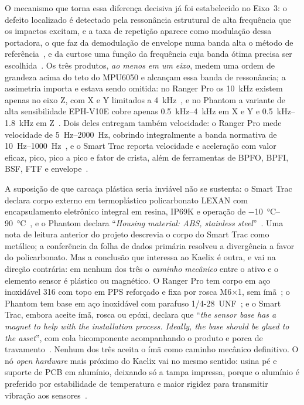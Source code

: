 \documentclass[11pt,a4paper]{article}
\begin{document}
O mecanismo que torna essa diferença decisiva já foi estabelecido no Eixo~3: o defeito
localizado é detectado pela ressonância estrutural de alta frequência que os impactos
excitam, e a taxa de repetição aparece como modulação dessa portadora, o que faz da
demodulação de envelope numa banda alta o método de referência~\cite{randall2011}, e da
curtose uma função da frequência cuja banda ótima precisa ser escolhida~\cite{antoni2006}.
Os três produtos, \emph{ao menos em um eixo}, medem uma ordem de grandeza acima do teto do
MPU6050 e alcançam essa banda de ressonância; a assimetria importa e estava sendo omitida:
no Ranger Pro os \SI{10}{\kilo\hertz} existem apenas no eixo Z, com X e Y limitados a
\SI{4}{\kilo\hertz}~\cite{bentlynevada2025}, e no Phantom a variante de alta sensibilidade
EPH-V10E cobre apenas \SIrange{0,5}{4}{\kilo\hertz} em X e Y e
\SIrange{0,5}{1,8}{\kilo\hertz} em Z~\cite{erbessd2025}. Dois deles entregam também
velocidade: o Ranger Pro mede velocidade de \SIrange{5}{2000}{\hertz}, cobrindo
integralmente a banda normativa de \SIrange{10}{1000}{\hertz}~\cite{bentlynevada2025}, e o
Smart Trac reporta velocidade e aceleração com valor eficaz, pico, pico a pico e fator de
crista, além de ferramentas de BPFO, BPFI, BSF, FTF e envelope~\cite{tractian2022}.

A suposição de que carcaça plástica seria inviável não se sustenta: o Smart Trac declara
corpo externo em termoplástico policarbonato LEXAN com encapsulamento eletrônico integral
em resina, IP69K e operação de \SIrange{-10}{90}{\celsius}~\cite{tractian2022}, e o Phantom
declara ``\textit{Housing material: ABS, stainless steel}''~\cite{erbessd2025}. Uma nota de
leitura anterior do projeto descrevia o corpo do Smart Trac como metálico; a conferência
da folha de dados primária resolveu a divergência a favor do policarbonato.
Mas a conclusão que interessa ao Kaelix é outra, e vai na direção contrária: em nenhum dos
três o \emph{caminho mecânico} entre o ativo e o elemento sensor é plástico ou magnético.
O Ranger Pro tem corpo em aço inoxidável 316 com topo em PPS reforçado e fixa por rosca
M6$\times$1, sem ímã~\cite{bentlynevada2025}; o Phantom tem base em aço inoxidável com
parafuso 1/4-28~UNF~\cite{erbessd2025}; e o Smart Trac, embora aceite ímã, rosca ou epóxi,
declara que ``\textit{the sensor base has a magnet to help with the installation process.
Ideally, the base should be glued to the asset}'', com cola bicomponente acompanhando o
produto e porca de travamento~\cite{tractian2022}. Nenhum dos três aceita o ímã como
caminho mecânico definitivo. O nó \emph{open hardware} mais próximo do Kaelix vai no mesmo
sentido: usina pé e suporte de PCB em alumínio, deixando só a tampa impressa, porque o
alumínio é preferido por estabilidade de temperatura e maior rigidez para transmitir
vibração aos sensores~\cite{jakobsen2024}.
\end{document}
